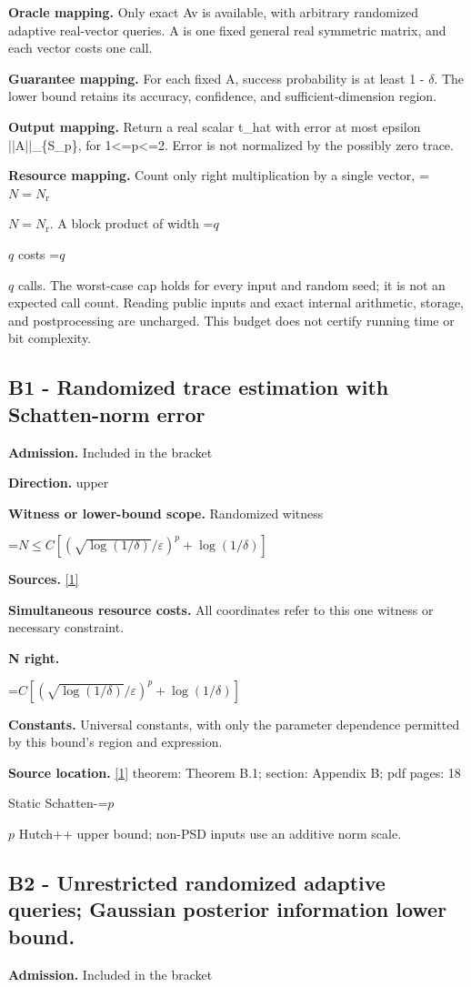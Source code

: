\documentclass[10pt,a4paper]{article}
\newcommand{\AtlasMath}[1]{\par\begingroup\centering\setbox0=\hbox{$\displaystyle #1$}\ifdim\wd0>1.4\linewidth\typeout{ATLAS WIDE FORMULA: \the\wd0}\fi\ifdim\wd0>\linewidth\resizebox{\linewidth}{!}{\box0}\else\box0\fi\par\endgroup}
\newcommand{\AtlasInlineMath}[1]{\begingroup\setbox0=\hbox{$#1$}\ifdim\wd0>.4\linewidth\endgroup\AtlasMath{#1}\else\endgroup$#1$\fi}
\begin{document}
\textbf{Oracle mapping.} Only exact Av is available, with arbitrary randomized adaptive real-vector queries. A is one fixed general real symmetric matrix, and each vector costs one call.

\textbf{Guarantee mapping.} For each fixed A, success probability is at least 1 - $\delta$. The lower bound retains its accuracy, confidence, and sufficient-dimension region.

\textbf{Output mapping.} Return a real scalar t\_hat with error at most epsilon ||A||\_\{S\_p\}, for 1<=p<=2. Error is not normalized by the possibly zero trace.

\textbf{Resource mapping.} Count only right multiplication by a single vector, \AtlasInlineMath{N=N_{\mathrm r}}. A block product of width \AtlasInlineMath{q} costs \AtlasInlineMath{q} calls. The worst-case cap holds for every input and random seed; it is not an expected call count. Reading public inputs and exact internal arithmetic, storage, and postprocessing are uncharged. This budget does not certify running time or bit complexity.

\subsection{B1 - Randomized trace estimation with Schatten-norm error}
\textbf{Admission.} Included in the bracket

\textbf{Direction.} upper

\textbf{Witness or lower-bound scope.} Randomized witness

\AtlasMath{N\le C[(\sqrt{\log(1/\delta)}/\varepsilon)^p+\log(1/\delta)]}
\textbf{Sources.} \href{https://arxiv.org/pdf/2209.15219v1}{[1]}

\textbf{Simultaneous resource costs.} All coordinates refer to this one witness or necessary constraint.

\textbf{N right.}

\AtlasMath{C[(\sqrt{\log(1/\delta)}/\varepsilon)^p+\log(1/\delta)]}
\textbf{Constants.} Universal constants, with only the parameter dependence permitted by this bound’s region and expression.

\textbf{Source location.} \href{https://arxiv.org/pdf/2209.15219v1}{[1]} theorem: Theorem B.1; section: Appendix B; pdf pages: 18

Static Schatten-\AtlasInlineMath{p} Hutch++ upper bound; non-PSD inputs use an additive norm scale.

\subsection{B2 - Unrestricted randomized adaptive queries; Gaussian posterior information lower bound.}
\textbf{Admission.} Included in the bracket
\end{document}
